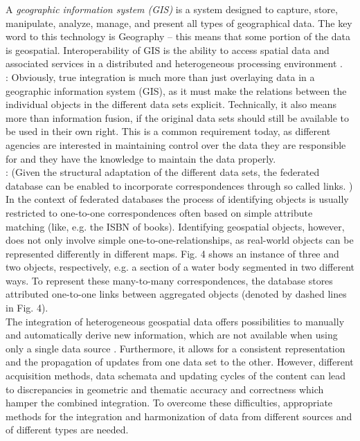 \documentclass[12pt,a4paper]{report}
\newcommand{\term}{\textit}
\newcommand{\acr}{\MakeUppercase}
\begin{document}
	A \term{geographic information system (\acr{gis})} is a system designed to capture, store, manipulate, analyze, manage, and present all types of geographical data. The key word to this technology is Geography – this means that some portion of the data is geospatial. Interoperability of \acr{gis} is the ability to access spatial data and associated services in a distributed and heterogeneous processing environment \citep{Gong}. 
	\\


	\citep{Butenuth}: Obviously, true integration is much more than just overlaying data in a geographic information system (GIS), as it must make the relations between the individual objects in the different data sets explicit. Technically, it also means more than information fusion, if the original data sets should still be available to be used in their own right. This is a common requirement today, as different agencies are interested in maintaining control over the data they are responsible for and they have the knowledge to maintain the data properly.
	\\


	\citep{Butenuth}: (Given the structural adaptation of the different data sets, the federated database can be enabled to incorporate correspondences through so called links. ) In the context of federated databases the process of identifying objects is usually restricted to one-to-one correspondences often based on simple attribute matching (like, e.g. the ISBN of books). Identifying geospatial objects, however, does not only involve simple one-to-one-relationships, as real-world objects can be represented differently in different maps. Fig. 4 shows an instance of three and two objects, respectively, e.g. a section of a water body segmented in two different ways. To represent these many-to-many correspondences, the database stores attributed one-to-one links between aggregated objects (denoted by dashed lines in Fig. 4).
	\\


	The integration of heterogeneous geospatial data offers possibilities to manually and automatically derive new information, which are not available when using only a single data source \citep{Butenuth}. Furthermore, it allows for a consistent representation and the propagation of updates from one data set to the other. However, different acquisition methods, data schemata and updating cycles of the content can lead to discrepancies in geometric and thematic accuracy and correctness which hamper the combined integration. To overcome these difficulties, appropriate methods for the integration and harmonization of data from different sources and of different types are needed.
	\\
\end{document}

